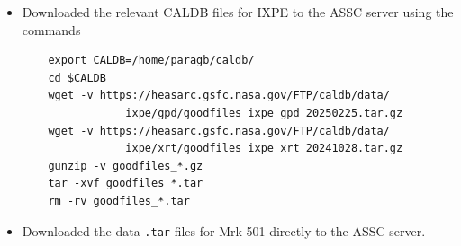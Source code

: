 	\begin{itemize}
		\item Downloaded the relevant CALDB files for IXPE to the ASSC server using the commands
        \begin{verbatim}
    export CALDB=/home/paragb/caldb/
    cd $CALDB
    wget -v https://heasarc.gsfc.nasa.gov/FTP/caldb/data/
                ixpe/gpd/goodfiles_ixpe_gpd_20250225.tar.gz
    wget -v https://heasarc.gsfc.nasa.gov/FTP/caldb/data/
                ixpe/xrt/goodfiles_ixpe_xrt_20241028.tar.gz
    gunzip -v goodfiles_*.gz
    tar -xvf goodfiles_*.tar
    rm -rv goodfiles_*.tar
        \end{verbatim}

        \item Downloaded the data \verb|.tar| files for Mrk 501 directly to the ASSC server. 
	\end{itemize}